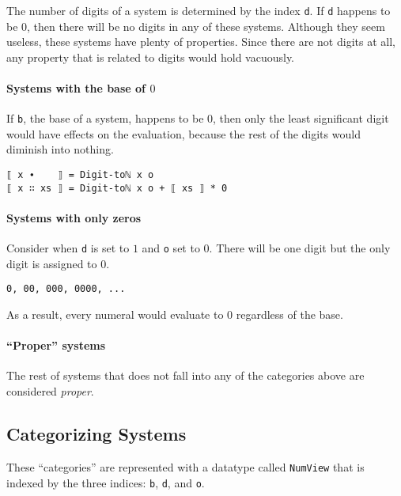 \documentclass[../thesis.tex]{subfiles}
\begin{document}
The number of digits of a system is determined by the index {\lstinline|d|}.
If {\lstinline|d|} happens to be $ 0 $, then there will be no digits in any of
these systems. Although they seem useless, these systems have plenty of properties.
Since there are not digits at all, any property that is related to digits would
hold vacuously.

\paragraph{Systems with the base of $ 0 $}

If {\lstinline|b|}, the base of a system, happens to be $ 0 $,
then only the least significant digit would have effects on the evaluation,
because the rest of the digits would diminish into nothing.

\begin{lstlisting}
⟦ x ∙    ⟧ = Digit-toℕ x o
⟦ x ∷ xs ⟧ = Digit-toℕ x o + ⟦ xs ⟧ * 0
\end{lstlisting}

\paragraph{Systems with only zeros}

Consider when {\lstinline|d|} is set to $ 1 $ and {\lstinline|o|} set to $ 0 $.
There will be one digit but the only digit is assigned to $ 0 $.

\begin{lstlisting}
0, 00, 000, 0000, ...
\end{lstlisting}

As a result, every numeral would evaluate to $ 0 $ regardless of the base.

\paragraph{``Proper'' systems}

The rest of systems that does not fall into any of the categories above
are considered \textit{proper}.

\subsection{Categorizing Systems}

These ``categories'' are represented with a datatype called {\lstinline|NumView|}
that is indexed by the three indices: {\lstinline|b|}, {\lstinline|d|}, and {\lstinline|o|}.
\end{document}
